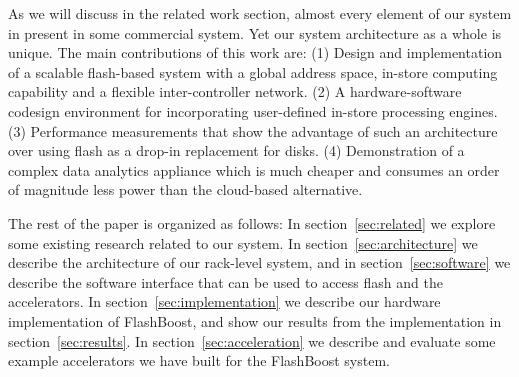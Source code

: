 As we will discuss in the related work section, almost every element of our
system in present in some commercial system. Yet our system architecture as a
whole is unique.  The main contributions of this work are: (1) Design and
implementation of a scalable flash-based system with a global address space,
in-store computing capability and a flexible inter-controller network. (2) A
hardware-software codesign environment for incorporating user-defined in-store
processing engines. (3) Performance measurements that show the advantage of such
an architecture over using flash as a drop-in replacement for disks. (4)
Demonstration of a complex data analytics appliance which is much cheaper and
consumes an order of magnitude less power than the cloud-based alternative.

The rest of the paper is organized as follows: In section~\ref{sec:related} we
explore some existing research related to our system. In
section~\ref{sec:architecture} we describe the architecture of our rack-level
system, and in section~\ref{sec:software} we describe the software interface
that can be used to access flash and the accelerators. In
section~\ref{sec:implementation} we describe our hardware implementation of
FlashBoost, and show our results from the implementation in
section~\ref{sec:results}.  In section~\ref{sec:acceleration} we describe and
evaluate some example accelerators we have built for the FlashBoost system. 




